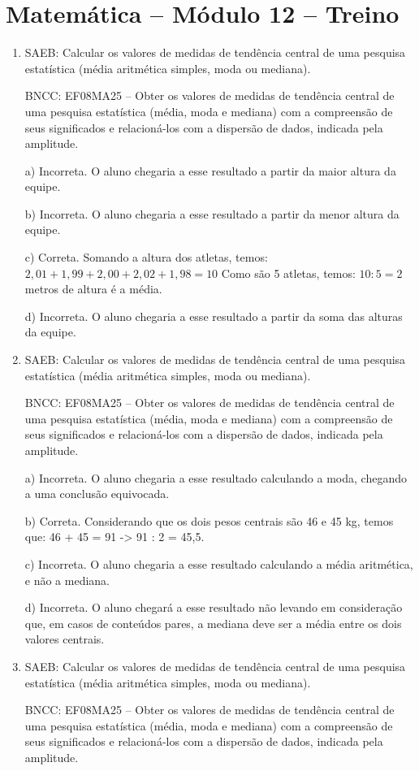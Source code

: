\section*{Matemática – Módulo 12 – Treino}
\begin{enumerate}
\item SAEB: Calcular os valores de medidas de tendência central de uma
pesquisa estatística (média aritmética simples, moda ou mediana).

BNCC: EF08MA25 -- Obter os valores de medidas de tendência central de
uma pesquisa estatística (média, moda e mediana) com a compreensão de
seus significados e relacioná-los com a dispersão de dados, indicada
pela amplitude.

a) Incorreta. O aluno chegaria a esse resultado a partir da maior
altura da equipe.

b) Incorreta. O aluno chegaria a esse resultado a partir da menor
altura da equipe.

c) Correta. Somando a altura dos atletas, temos:
$2,01 + 1,99 + 2,00 + 2,02 + 1,98 =10$
Como são 5 atletas, temos:
$10 : 5 = 2$ metros de altura é a média.

d) Incorreta. O aluno chegaria a esse resultado a partir da soma
das alturas da equipe.
\item SAEB: Calcular os valores de medidas de tendência central de uma
pesquisa estatística (média aritmética simples, moda ou mediana).

BNCC: EF08MA25 -- Obter os valores de medidas de tendência central de
uma pesquisa estatística (média, moda e mediana) com a compreensão de
seus significados e relacioná-los com a dispersão de dados, indicada
pela amplitude.

a) Incorreta. O aluno chegaria a esse resultado calculando a moda,
chegando a uma conclusão equivocada.

b) Correta. Considerando que os dois pesos centrais são 46 e 45 kg,
temos que: 46 + 45 = 91 -> 91 : 2 = 45,5.

c) Incorreta. O aluno chegaria a esse resultado calculando a média
aritmética, e não a mediana.

d) Incorreta. O aluno chegará a esse resultado não levando em
consideração que, em casos de conteúdos pares, a mediana deve ser a
média entre os dois valores centrais.
\item SAEB: Calcular os valores de medidas de tendência central de uma
pesquisa estatística (média aritmética simples, moda ou mediana).

BNCC: EF08MA25 -- Obter os valores de medidas de tendência central de
uma pesquisa estatística (média, moda e mediana) com a compreensão de
seus significados e relacioná-los com a dispersão de dados, indicada
pela amplitude.


\end{enumerate}
